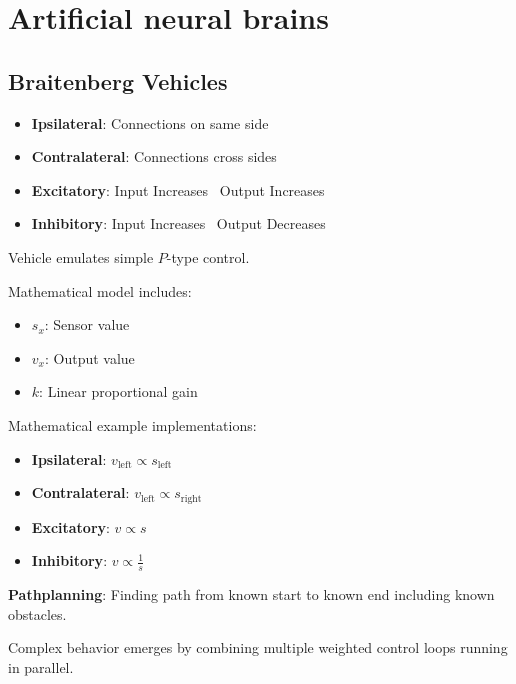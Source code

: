 \documentclass[
    fontsize      = 11pt,
    paper         = a4,
    twoside       = false,
    parskip       = half,
    pagesize      = false,
]{scrartcl}
\providecommand{\tightlist}{%
  \setlength{\itemsep}{0pt}\setlength{\parskip}{0pt}}
\begin{document}
\hypertarget{artificial-neural-brains}{%
\section{Artificial neural brains}\label{artificial-neural-brains}}

\hypertarget{braitenberg-vehicles}{%
\subsection{Braitenberg Vehicles}\label{braitenberg-vehicles}}

\begin{itemize}
\tightlist
\item
  \textbf{Ipsilateral}: Connections on same side
\item
  \textbf{Contralateral}: Connections cross sides
\item
  \textbf{Excitatory}: Input Increases \textrightarrow~Output Increases
\item
  \textbf{Inhibitory}: Input Increases \textrightarrow~Output Decreases
\end{itemize}

Vehicle emulates simple \(P\)-type control.

Mathematical model includes:

\begin{itemize}
\tightlist
\item
  \(s_x\): Sensor value
\item
  \(v_x\): Output value
\item
  \(k\): Linear proportional gain
\end{itemize}

Mathematical example implementations:

\begin{itemize}
\tightlist
\item
  \textbf{Ipsilateral}: \(v_{\text{left}} \propto s_{\text{left}}\)
\item
  \textbf{Contralateral}: \(v_{\text{left}} \propto s_{\text{right}}\)
\item
  \textbf{Excitatory}: \(v \propto s\)
\item
  \textbf{Inhibitory}: \(v \propto \frac{1}{s}\)
\end{itemize}

\textbf{Pathplanning}: Finding path from known start to known end
including known obstacles.

Complex behavior emerges by combining multiple weighted control loops
running in parallel.
\end{document}
